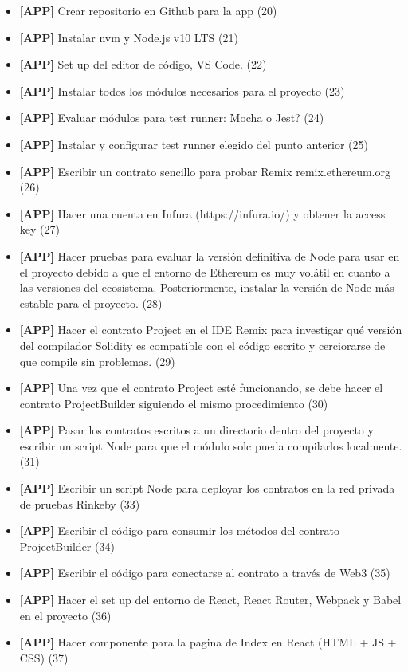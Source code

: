 \begin{itemize}
\item \textbf{[APP]} Crear repositorio en Github para la app (20)
\item \textbf{[APP]} Instalar nvm y Node.js v10 LTS (21)
\item \textbf{[APP]} Set up del editor de código, VS Code. (22)
\item \textbf{[APP]} Instalar todos los módulos necesarios para el proyecto (23)
\item \textbf{[APP]} Evaluar módulos para test runner: Mocha o Jest? (24)
\item \textbf{[APP]} Instalar y configurar test runner elegido del punto anterior (25)
\item \textbf{[APP]} Escribir un contrato sencillo para probar Remix remix.ethereum.org (26)
\item \textbf{[APP]} Hacer una cuenta en Infura (https://infura.io/) y obtener la access key (27)
\item \textbf{[APP]} Hacer pruebas para evaluar la versión definitiva de Node para usar en el
proyecto debido a que el entorno de Ethereum es muy volátil en cuanto a las versiones del
ecosistema. Posteriormente, instalar la versión de Node más estable para el proyecto. (28)
\item \textbf{[APP]} Hacer el contrato Project en el IDE Remix para investigar qué versión del
compilador Solidity es compatible con el código escrito y cerciorarse de que compile sin problemas.
(29)
\item \textbf{[APP]} Una vez que el contrato Project esté funcionando, se debe hacer el contrato
ProjectBuilder siguiendo el mismo procedimiento (30)
\item \textbf{[APP]} Pasar los contratos escritos a un directorio dentro del proyecto y escribir
un script Node para que el módulo solc pueda compilarlos localmente. (31)
\item \textbf{[APP]} Escribir un script Node para deployar los contratos en la red privada de 
pruebas Rinkeby (33)
\item \textbf{[APP]} Escribir el código para consumir los métodos del contrato ProjectBuilder (34)
\item \textbf{[APP]} Escribir el código para conectarse al contrato a través de Web3 (35)
\item \textbf{[APP]} Hacer el set up del entorno de React, React Router, Webpack y Babel en el
proyecto (36)
\item \textbf{[APP]} Hacer componente para la pagina de Index en React (HTML + JS + CSS) (37)

\end{itemize}

